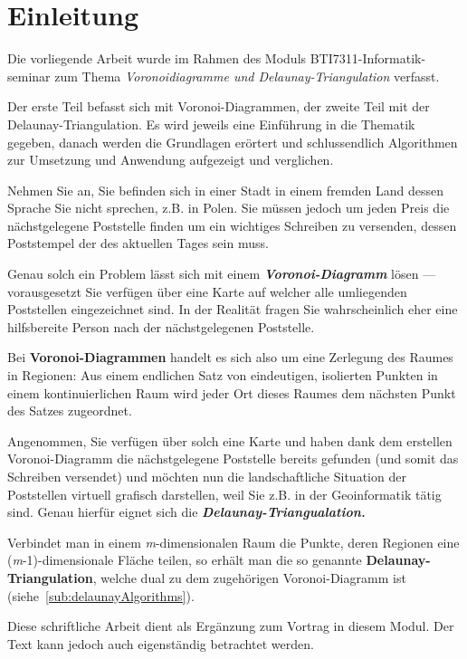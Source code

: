 \section{Einleitung}
\label{sec:introduction}
Die vorliegende Arbeit wurde im Rahmen des Moduls BTI7311-Informatik-\\
seminar zum Thema \textit{Voronoidiagramme und Delaunay-Triangulation} verfasst.

Der erste Teil befasst sich mit Voronoi-Diagrammen, der zweite Teil mit der Delaunay-Triangulation. Es wird jeweils eine Einführung in die Thematik gegeben, danach werden die Grundlagen erörtert und schlussendlich Algorithmen zur Umsetzung und Anwendung aufgezeigt und verglichen.

Nehmen Sie an, Sie befinden sich in einer Stadt in einem fremden Land dessen Sprache Sie nicht sprechen, z.B. in Polen.
Sie müssen jedoch um jeden Preis die nächstgelegene Poststelle finden um ein wichtiges Schreiben zu versenden, dessen
Poststempel der des aktuellen Tages sein muss.

Genau solch ein Problem lässt sich mit einem \textit{\textbf{Voronoi-Diagramm}} lösen --- vorausgesetzt Sie verfügen über eine Karte auf welcher
alle umliegenden Poststellen eingezeichnet sind. In der Realität fragen Sie wahrscheinlich eher eine hilfsbereite Person
nach der nächstgelegenen Poststelle.

Bei \textbf{Voronoi-Diagrammen} handelt es sich also um eine Zerlegung des Raumes in Regionen: Aus einem endlichen Satz von eindeutigen, isolierten Punkten in einem kontinuierlichen Raum wird jeder Ort dieses Raumes dem nächsten Punkt des Satzes zugeordnet.

Angenommen, Sie verfügen über solch eine Karte und haben dank dem erstellen Voronoi-Diagramm die nächstgelegene Poststelle bereits gefunden (und somit das Schreiben versendet) und
möchten nun die landschaftliche Situation der Poststellen virtuell grafisch darstellen, weil Sie z.B. in der Geoinformatik tätig sind. Genau hierfür
eignet sich die \textit{\textbf{Delaunay-Triangualation.}}

Verbindet man in einem \textit{m}-dimensionalen Raum die Punkte, deren Regionen eine (\textit{m}-1)-dimensionale Fläche teilen, so erhält man die so genannte \textbf{Delaunay-Triangulation},
welche dual zu dem zugehörigen Voronoi-Diagramm ist (siehe~\ref{sub:delaunayAlgorithms}).

Diese schriftliche Arbeit dient als Ergänzung zum Vortrag in diesem Modul.
Der Text kann jedoch auch eigenständig betrachtet werden.
